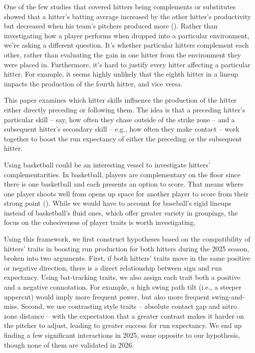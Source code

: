 \documentclass{article}
\begin{document}
One of the few studies that covered hitters being complements or substitutes showed that a hitter's batting average increased by the other hitter's productivity but decreased when his team's pitchers produced more (\cite{gould2007interactions}). Rather than investigating how a player performs when dropped into a particular environment, we're asking a different question. It's whether particular hitters complement each other, rather than evaluating the gain in one hitter from the environment they were placed in. Furthermore, it's hard to justify every hitter affecting a particular hitter. For example, it seems highly unlikely that the eighth hitter in a lineup impacts the production of the fourth hitter, and vice versa.

This paper examines which hitter skills influence the production of the hitter either directly preceding or following them.  The idea is that a preceding hitter's particular skill -- say, how often they chase outside of the strike zone -- and a subsequent hitter's secondary skill -- e.g., how often they make contact -- work together to boost the run expectancy of either the preceding or the subsequent hitter.

Using basketball could be an interesting vessel to investigate hitters' complementarities. In basketball, players are complementary on the floor since there is one basketball and each presents an option to score. That means where one player shoots well from opens up space for another player to score from their strong point (\cite{kuehn2016complementary}). While we would have to account for baseball's rigid lineups instead of basketball's fluid ones, which offer greater variety in groupings, the focus on the cohesiveness of player traits is worth investigating.

Using this framework, we first construct hypotheses based on the compatibility of hitters' traits in boosting run production for both hitters during the 2025 season, broken into two arguments. First, if both hitters' traits move in the same positive or negative direction, there is a direct relationship between sign and run expectancy.  Using bat-tracking traits, we also assign each trait both a positive and a negative connotation. For example, a high swing path tilt (i.e., a steeper uppercut) would imply more frequent power, but also more frequent swing-and-miss. Second, we use contrasting style traits -- absolute contact gap and nitro zone distance -- with the expectation that a greater contrast makes it harder on the pitcher to adjust, leading to greater success for run expectancy. We end up finding a few significant interactions in 2025, some opposite to our hypothesis, though none of them are validated in 2026.
\end{document}
